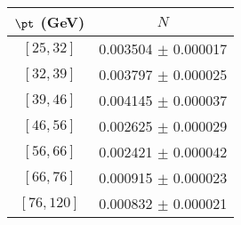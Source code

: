 \begin{tabular}{c||c}
$\pt$ (GeV) & $N$  \\
\hline
$[25, 32]$ & 0.003504 $\pm$ 0.000017\\
$[32, 39]$ & 0.003797 $\pm$ 0.000025\\
$[39, 46]$ & 0.004145 $\pm$ 0.000037\\
$[46, 56]$ & 0.002625 $\pm$ 0.000029\\
$[56, 66]$ & 0.002421 $\pm$ 0.000042\\
$[66, 76]$ & 0.000915 $\pm$ 0.000023\\
$[76, 120]$ & 0.000832 $\pm$ 0.000021\\
\end{tabular}
